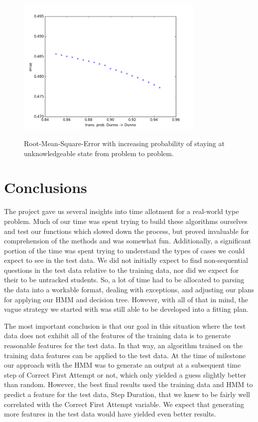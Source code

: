 \documentclass{article} %
\begin{document}
\begin{figure}[h]
\begin{center}
\includegraphics[width=0.8\textwidth]{dunno.png}
\label{fig:dunno}
\end{center}
\caption{Root-Mean-Square-Error with increasing probability of staying at unknowledgeable state from problem to problem.}
\end{figure}

\section{Conclusions}

The project gave us several insights into time allotment for a real-world type problem. Much of our time was spent trying to build these algorithms ourselves and test our functions which slowed down the process, but proved invaluable for comprehension of the methods and was somewhat fun. Additionally, a significant portion of the time was spent trying to understand the types of cases we could expect to see in the test data. We did not initially expect to find non-sequential questions in the test data relative to the training data, nor did we expect for their to be untracked students. So, a lot of time had to be allocated to parsing the data into a workable format, dealing with exceptions, and adjusting our plans for applying our HMM and decision tree. However, with all of that in mind, the vague strategy we started with was still able to be developed into a fitting plan.

The most important conclusion is that our goal in this situation where the test data does not exhibit all of the features of the training data is to generate reasonable features for the test data. In that way, an algorithm trained on the training data features can be applied to the test data. At the time of milestone our approach with the HMM was to generate an output at a subsequent time step of Correct First Attempt or not, which only yielded a guess slightly better than random. However, the best final results used the training data and HMM to predict a feature for the test data, Step Duration, that we knew to be fairly well correlated with the Correct First Attempt variable. We expect that generating more features in the test data would have yielded even better results. 
\end{document}
